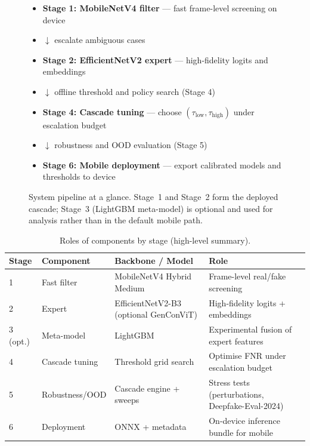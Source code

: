 \begin{figure}[ht]
  \centering
  \small
  \begin{itemize}[leftmargin=*,itemsep=2pt,parsep=0pt]
    \item \textbf{Stage 1: MobileNetV4 filter} --- fast frame-level screening on device
    \item $\downarrow$ escalate ambiguous cases
    \item \textbf{Stage 2: EfficientNetV2 expert} --- high-fidelity logits and embeddings
    \item $\downarrow$ offline threshold and policy search (Stage 4)
    \item \textbf{Stage 4: Cascade tuning} --- choose $(\tau_{\mathrm{low}},\tau_{\mathrm{high}})$ under escalation budget
    \item $\downarrow$ robustness and OOD evaluation (Stage 5)
    \item \textbf{Stage 6: Mobile deployment} --- export calibrated models and thresholds to device
  \end{itemize}
  \caption{System pipeline at a glance. Stage~1 and Stage~2 form the deployed cascade; Stage~3 (LightGBM meta-model) is optional and used for analysis rather than in the default mobile path.}
  \label{fig:pipeline_overview}
\end{figure}

\begin{table}[h]
  \centering
  \caption{Roles of components by stage (high-level summary).}
  \label{tab:stage_roles}
  \begin{tabular}{llll}
    \toprule
    Stage & Component & Backbone / Model & Role \\
    \midrule
    1 & Fast filter & MobileNetV4 Hybrid Medium & Frame-level real/fake screening \\
    2 & Expert & EfficientNetV2-B3 (optional GenConViT) & High-fidelity logits + embeddings \\
    3 (opt.) & Meta-model & LightGBM & Experimental fusion of expert features \\
    4 & Cascade tuning & Threshold grid search & Optimise FNR under escalation budget \\
    5 & Robustness/OOD & Cascade engine + sweeps & Stress tests (perturbations, Deepfake-Eval-2024) \\
    6 & Deployment & ONNX + metadata & On-device inference bundle for mobile \\
    \bottomrule
  \end{tabular}
\end{table}

